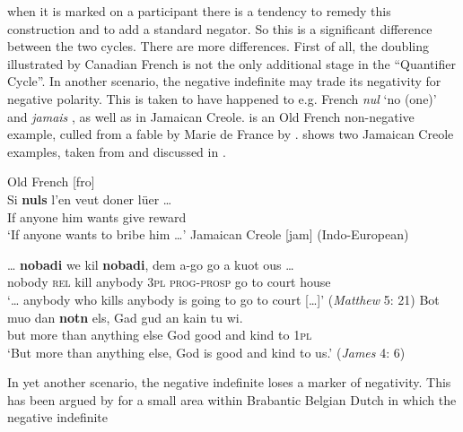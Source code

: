 ﻿\documentclass[output=paper]{langsci/langscibook}
\begin{document}
when it is marked on a participant there is a tendency to remedy this
construction and to add a standard negator. So this is a significant
difference between the two cycles. There are more differences. First of
all, the doubling illustrated by Canadian French is not the only
additional stage in the ``Quantifier Cycle''. In another scenario, the
negative indefinite may trade its negativity for negative polarity. This is
taken to have happened to e.g. French \textit{nul} `no (one)'
\parencites(see)()[113--114]{Catalani2001}[135--137]{Buridant2000}[327]{AuweraAlsenoy2011}[211--213]{Gianollo2018a}
and \textit{jamais} \citep{MosegaardHansen2012}, as well as in Jamaican
Creole.   is an Old French non-negative
example, culled from a fable by Marie de France by
\citet[167]{Buridant2000}.   shows two
Jamaican Creole examples, taken from
\citet{DiTestament2012} and discussed in \citet{AuweraLisser2019}.
%
\begin{exe}\ex\label{ex:int-oldfrench-bribe}
Old French [fro] \\
    \gll Si  \textbf{nuls}    l'en  veut  doner  lüer \ldots \\
      If  anyone  him  wants  give  reward \\
    \glt `If anyone wants to bribe him \ldots'
\ex\label{ex:int-jamaicancr-kill}
   Jamaican Creole [jam] (Indo-European)
   \begin{xlist}
   \ex\label{ex:int-jamaicancr-kill-a}
   \gll \ob\ldots{\cb} \textbf{nobadi} we kil \textbf{nobadi}, dem a-go
   go a kuot ous \ob\ldots{\cb} \\
  {} nobody \textsc{rel} kill anybody \textsc{3pl}
  \textsc{prog}-\textsc{prosp} go to  court  house \\
    \glt `\ldots{} anybody who kills anybody is going to go to court
    [\ldots]' (\textit{Matthew} 5: 21)
    \ex\gll Bot muo dan \textbf{notn} els, Gad gud an kain tu wi.\\ 
    but more than anything else God good and kind to \textsc{1pl}\\
    \glt `But more than anything else, God is good and kind to us.'
    (\textit{James} 4: 6)
    \end{xlist}\end{exe}
%
In yet another scenario, the negative indefinite loses a marker of
negativity. This has been argued by \citet{AuweraCuypere2006} for a
small area within Brabantic Belgian Dutch in which the negative indefinite
\end{document}
